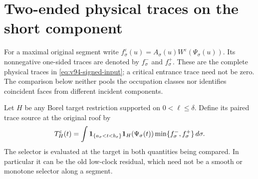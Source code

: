 \section{Two-ended physical traces on the short component}
\label{sec:v98-paired}
For a maximal original segment write
$f_\sigma^\varepsilon(u)=A_\sigma(u)W^\varepsilon(\Psi_\sigma(u))$.
Its nonnegative one-sided traces are denoted by
$f_\sigma^-$ and $f_\sigma^+$. These are the complete physical
traces in \eqref{eq:v94-signed-input}; a critical entrance trace
need not be zero. The comparison below neither pools the occupation
classes nor identifies coincident faces from different incident
components.

Let $H$ be any Borel target restriction supported on
$0<\ell\le\delta$. Define its paired trace source at the original
roof by
\begin{equation}\label{eq:v98-paired-trace}
 T_H^\varepsilon(t)=\int
   \one_{\{a_\sigma<t<b_\sigma\}}\one_H(\Psi_\sigma(t))
                \min\{f_\sigma^-,f_\sigma^+\}\,d\sigma.
\end{equation}
The selector is evaluated at the target in both quantities being
compared. In particular it can be the old low-clock residual, which
need not be a smooth or monotone selector along a segment.

